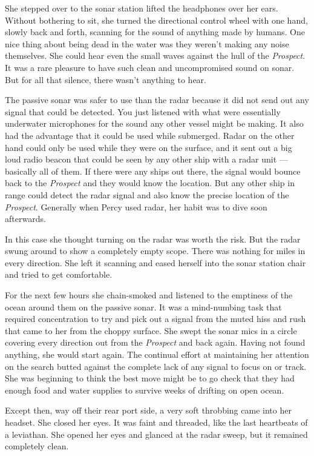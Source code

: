 \documentclass[]{scrbook}
\begin{document}
She stepped over to the sonar station lifted the headphones over her
ears. Without bothering to sit, she turned the directional control wheel
with one hand, slowly back and forth, scanning for the sound of anything
made by humans. One nice thing about being dead in the water was they
weren't making any noise themselves. She could hear even the small waves
against the hull of the \emph{Prospect}. It was a rare pleasure to have
such clean and uncompromised sound on sonar. But for all that silence,
there wasn't anything to hear.

The passive sonar was safer to use than the radar because it did not
send out any signal that could be detected. You just listened with what
were essentially underwater microphones for the sound any other vessel
might be making. It also had the advantage that it could be used while
submerged. Radar on the other hand could only be used while they were on
the surface, and it sent out a big loud radio beacon that could be seen
by any other ship with a radar unit --- basically all of them. If there
were any ships out there, the signal would bounce back to the
\emph{Prospect} and they would know the location. But any other ship in
range could detect the radar signal and also know the precise location
of the \emph{Prospect}. Generally when Percy used radar, her habit was
to dive soon afterwards.

In this case she thought turning on the radar was worth the risk. But
the radar swung around to show a completely empty scope. There was
nothing for miles in every direction. She left it scanning and eased
herself into the sonar station chair and tried to get comfortable.

For the next few hours she chain-smoked and listened to the emptiness of
the ocean around them on the passive sonar. It was a mind-numbing task
that required concentration to try and pick out a signal from the muted
hiss and rush that came to her from the choppy surface. She swept the
sonar mics in a circle covering every direction out from the
\emph{Prospect} and back again. Having not found anything, she would
start again. The continual effort at maintaining her attention on the
search butted against the complete lack of any signal to focus on or
track. She was beginning to think the best move might be to go check
that they had enough food and water supplies to survive weeks of
drifting on open ocean.

Except then, way off their rear port side, a very soft throbbing came
into her headset. She closed her eyes. It was faint and threaded, like
the last heartbeats of a leviathan. She opened her eyes and glanced at
the radar sweep, but it remained completely clean.
\end{document}
